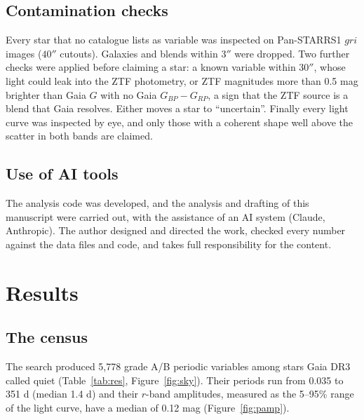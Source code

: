\documentclass[twocolumn]{searchchev_preprint}
\begin{document}
\subsection{Contamination checks}
Every star that no catalogue lists as variable was inspected on Pan-STARRS1 \citep{Chambers2016} $gri$ images
($40''$ cutouts). Galaxies and blends within $3''$ were dropped. Two further checks were applied before claiming a star:
a known variable within $30''$, whose light could leak into the ZTF photometry, or ZTF magnitudes more than 0.5 mag
brighter than Gaia $G$ with no Gaia $G_{BP}-G_{RP}$, a sign that the ZTF source is a blend that Gaia resolves. Either
moves a star to ``uncertain''. Finally every light curve was inspected by eye, and only those with a coherent shape
well above the scatter in both bands are claimed.

\subsection{Use of AI tools}
The analysis code was developed, and the analysis and drafting of this manuscript were carried out, with the
assistance of an AI system (Claude, Anthropic). The author designed and directed the work, checked every number
against the data files and code, and takes full responsibility for the content.

\section{Results}
\subsection{The census}
The search produced 5,778 grade A/B periodic variables among stars Gaia DR3 called quiet (Table~\ref{tab:res},
Figure~\ref{fig:sky}). Their periods run from 0.035 to 351 d (median 1.4 d) and their $r$-band amplitudes, measured
as the 5--95\% range of the light curve, have a median of 0.12 mag (Figure~\ref{fig:pamp}).
\end{document}

